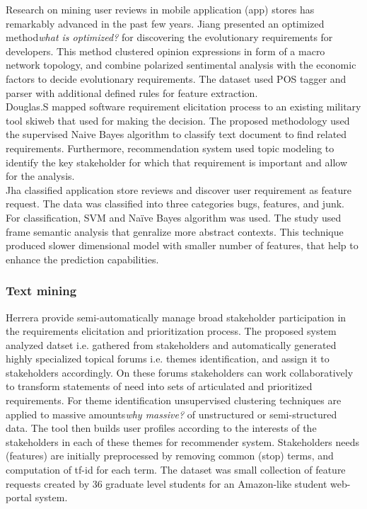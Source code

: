 Research on mining user reviews in mobile application (app) stores has
remarkably advanced in the past few years. Jiang \etal
\cite{Jiang:2014} presented an optimized method\emph{what is optimized?} for
discovering the evolutionary requirements for developers. This method clustered opinion expressions in form of a macro network
topology, and combine polarized sentimental analysis with the economic factors
to decide evolutionary requirements. The dataset used POS tagger and parser with
additional defined rules for feature extraction.\\

Douglas.S \etal\cite{Douglas:S2008} mapped software requirement elicitation process to an
existing military tool skiweb that used for making the decision. The proposed
methodology used the supervised Naive Bayes algorithm to classify text document
to find related requirements. Furthermore, recommendation system used topic modeling to
identify the key stakeholder for which that requirement is important and allow
for the analysis.\\

Jha \etal \cite{Jha:2017} classified application store reviews and discover user
requirement as feature request. The data was classified into three categories bugs,
features, and junk. For classification, SVM and Naïve Bayes algorithm was used.
The study used frame semantic analysis that genralize more abstract contexts.
This technique produced slower dimensional model with smaller number of
features, that help to enhance the prediction capabilities.\\


\subsubsection{Text mining}

 
Herrera \etal \cite{Castro-Herrera:2009} provide semi-automatically manage broad stakeholder participation in the requirements elicitation
and prioritization process. The proposed system analyzed datset i.e. gathered
from stakeholders and automatically generated highly specialized topical forums
i.e. themes identification, and assign it to stakeholders accordingly.
On these forums stakeholders can work collaboratively to transform statements of
need into sets of articulated and prioritized requirements. For theme
identification unsupervised clustering techniques are applied to massive
amounts\emph{why massive?} of unstructured or semi-structured data. The tool
then builds user profiles according to the interests of the stakeholders in each
of these themes for recommender system. Stakeholders needs
(features) are initially preprocessed
by removing common (stop) terms, and computation of tf-id  for each term. The dataset was  small
collection of feature requests created by 36 graduate level students for an Amazon-like student web-portal system.\\


